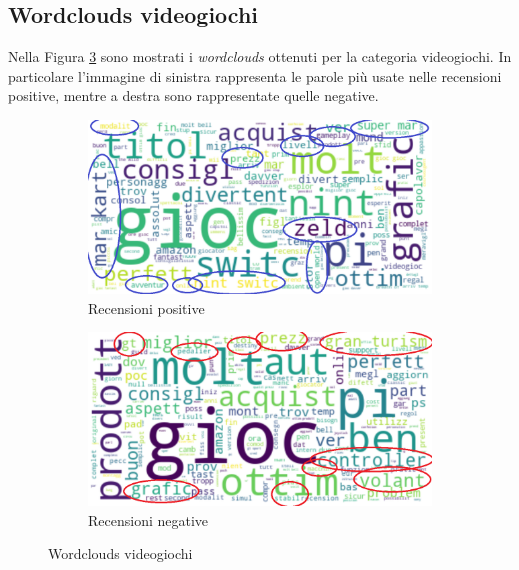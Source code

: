 		
		\subsection{Wordclouds videogiochi}
			Nella Figura \ref{fig:wordclouds_videogames} sono mostrati i \textit{wordclouds} ottenuti per la categoria videogiochi. In particolare l'immagine di sinistra rappresenta le parole più usate nelle recensioni positive, mentre a destra sono rappresentate quelle negative. 
			
			\begin{figure} [h]
				\centering
				\begin{subfigure}{0.48\textwidth}
					\includegraphics[width=\textwidth]{Figure/top_positive_videogames}
					\caption{Recensioni positive}
					\label{fig:top_positive_videogames}
				\end{subfigure}
				\begin{subfigure}{0.48\textwidth}
					\includegraphics[width=\textwidth]{Figure/top_negative_videogames}
					\caption{Recensioni negative}
					\label{fig:top_negative_videogames}
				\end{subfigure}
				\caption{Wordclouds videogiochi}\label{fig:wordclouds_videogames}
			\end{figure}
			
